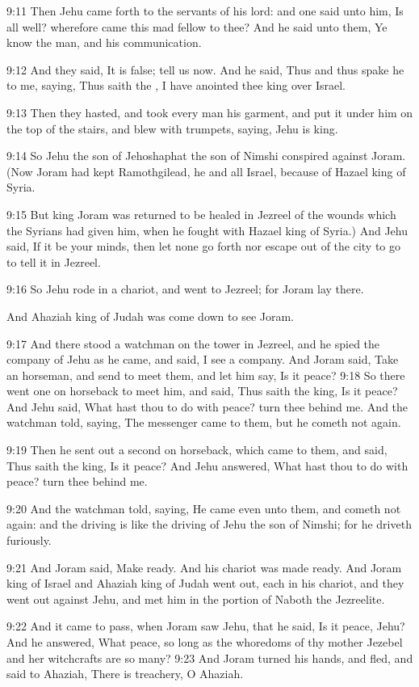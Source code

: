 9:11 Then Jehu came forth to the servants of his lord: and one said unto him, Is all well? wherefore came this mad fellow to thee? And he said unto them, Ye know the man, and his communication.

9:12 And they said, It is false; tell us now. And he said, Thus and thus spake he to me, saying, Thus saith the \LORD, I have anointed thee king over Israel.

9:13 Then they hasted, and took every man his garment, and put it under him on the top of the stairs, and blew with trumpets, saying, Jehu is king.

9:14 So Jehu the son of Jehoshaphat the son of Nimshi conspired against Joram. (Now Joram had kept Ramothgilead, he and all Israel, because of Hazael king of Syria.

9:15 But king Joram was returned to be healed in Jezreel of the wounds which the Syrians had given him, when he fought with Hazael king of Syria.)  And Jehu said, If it be your minds, then let none go forth nor escape out of the city to go to tell it in Jezreel.

9:16 So Jehu rode in a chariot, and went to Jezreel; for Joram lay there.

And Ahaziah king of Judah was come down to see Joram.

9:17 And there stood a watchman on the tower in Jezreel, and he spied the company of Jehu as he came, and said, I see a company. And Joram said, Take an horseman, and send to meet them, and let him say, Is it peace?  9:18 So there went one on horseback to meet him, and said, Thus saith the king, Is it peace? And Jehu said, What hast thou to do with peace? turn thee behind me. And the watchman told, saying, The messenger came to them, but he cometh not again.

9:19 Then he sent out a second on horseback, which came to them, and said, Thus saith the king, Is it peace? And Jehu answered, What hast thou to do with peace? turn thee behind me.

9:20 And the watchman told, saying, He came even unto them, and cometh not again: and the driving is like the driving of Jehu the son of Nimshi; for he driveth furiously.

9:21 And Joram said, Make ready. And his chariot was made ready. And Joram king of Israel and Ahaziah king of Judah went out, each in his chariot, and they went out against Jehu, and met him in the portion of Naboth the Jezreelite.

9:22 And it came to pass, when Joram saw Jehu, that he said, Is it peace, Jehu? And he answered, What peace, so long as the whoredoms of thy mother Jezebel and her witchcrafts are so many?  9:23 And Joram turned his hands, and fled, and said to Ahaziah, There is treachery, O Ahaziah.


